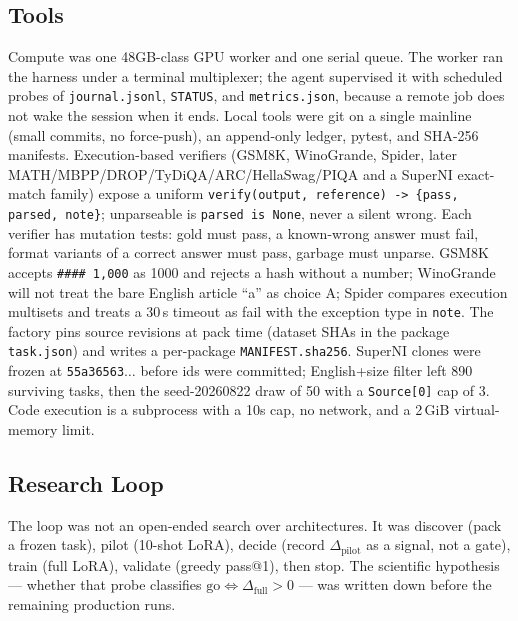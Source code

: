 \subsection{Tools}
\label{p2:tools}
Compute was one 48GB-class GPU worker and one serial queue.
The worker ran the harness under a terminal multiplexer; the agent
supervised it with scheduled probes of \texttt{journal.jsonl},
\texttt{STATUS}, and \texttt{metrics.json}, because a remote job
does not wake the session when it ends.
Local tools were git on a single mainline (small commits, no
force-push), an append-only ledger, pytest, and SHA-256 manifests.
Execution-based verifiers (GSM8K, WinoGrande, Spider, later
MATH/MBPP/DROP/TyDiQA/ARC/HellaSwag/PIQA and a SuperNI exact-match
family) expose a uniform
\texttt{verify(output, reference) -> \{pass, parsed, note\}};
unparseable is \texttt{parsed is None}, never a silent wrong.
Each verifier has mutation tests: gold must pass, a known-wrong
answer must fail, format variants of a correct answer must pass,
garbage must unparse.
GSM8K accepts \texttt{\#\#\#\# 1,000} as 1000 and rejects a
hash without a number; WinoGrande will not treat the bare English
article ``a'' as choice A; Spider compares execution multisets and
treats a 30\,s timeout as fail with the exception type in
\texttt{note}.
The factory pins source revisions at pack time (dataset SHAs in
the package \texttt{task.json}) and writes a per-package
\texttt{MANIFEST.sha256}. SuperNI clones were frozen at
\texttt{55a36563}$\ldots$ before ids were committed; English+size
filter left 890 surviving tasks, then the seed-20260822 draw of 50
with a \texttt{Source[0]} cap of 3.
Code execution is a subprocess with a 10s cap, no network, and a
2\,GiB virtual-memory limit.

\subsection{Research Loop}
\label{p2:loop}
The loop was not an open-ended search over architectures. It was
discover (pack a frozen task), pilot (10-shot LoRA), decide (record
$\Delta_{\mathrm{pilot}}$ as a signal, not a gate), train (full
LoRA), validate (greedy pass@1), then stop. The scientific
hypothesis --- whether that probe classifies
$\mathrm{go}\Leftrightarrow\Delta_{\mathrm{full}}>0$ --- was
written down before the remaining production runs.

